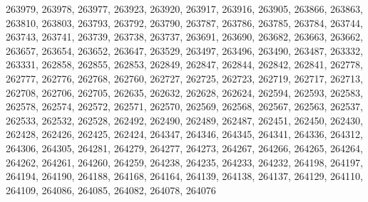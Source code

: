 \begin{appendix}
\begin{itemize}
     263979, 263978, 263977, 263923, 263920, 263917, 263916, 263905, 263866, 263863,\\
     263810, 263803, 263793, 263792, 263790, 263787, 263786, 263785, 263784, 263744,\\
     263743, 263741, 263739, 263738, 263737, 263691, 263690, 263682, 263663, 263662,\\
     263657, 263654, 263652, 263647, 263529, 263497, 263496, 263490, 263487, 263332,\\
     263331, 262858, 262855, 262853, 262849, 262847, 262844, 262842, 262841, 262778,\\
     262777, 262776, 262768, 262760, 262727, 262725, 262723, 262719, 262717, 262713,\\
     262708, 262706, 262705, 262635, 262632, 262628, 262624, 262594, 262593, 262583,\\
     262578, 262574, 262572, 262571, 262570, 262569, 262568, 262567, 262563, 262537,\\
     262533, 262532, 262528, 262492, 262490, 262489, 262487, 262451, 262450, 262430,\\
     262428, 262426, 262425, 262424, 264347, 264346, 264345, 264341, 264336, 264312,\\
     264306, 264305, 264281, 264279, 264277, 264273, 264267, 264266, 264265, 264264,\\
     264262, 264261, 264260, 264259, 264238, 264235, 264233, 264232, 264198, 264197,\\
     264194, 264190, 264188, 264168, 264164, 264139, 264138, 264137, 264129, 264110,\\
     264109, 264086, 264085, 264082, 264078, 264076 
\end{itemize}


\end{appendix}
